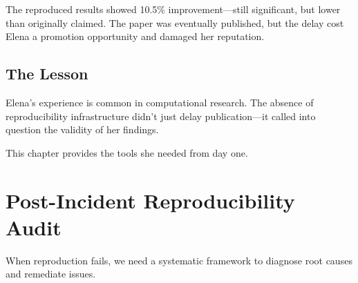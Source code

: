 The reproduced results showed 10.5\% improvement---still significant, but lower than originally claimed. The paper was eventually published, but the delay cost Elena a promotion opportunity and damaged her reputation.

\subsection{The Lesson}

Elena's experience is common in computational research. The absence of reproducibility infrastructure didn't just delay publication---it called into question the validity of her findings.

This chapter provides the tools she needed from day one.

\section{Post-Incident Reproducibility Audit}

When reproduction fails, we need a systematic framework to diagnose root causes and remediate issues.


